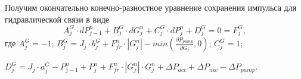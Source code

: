 Получим окончательно конечно-разностное уравнение сохранения импульса для гидравлической связи в виде
\begin{equation}
\label{formula413}
\boxed{A_j^G \cdot dP_{j-1}^n + B_j^G \cdot dG_j^n + C_j^G \cdot dP_j^n + D_j^G = 0 = F_j^G},
\end{equation}
где $A_j^G=-1$; $B_j^G = J_j \cdot b_j^G + F_{fr}^n\cdot | G_j^n | - min\left(\frac{\partial P_{pump}}{\partial G_j},0\right) $; $C_j^G=1$;

\noindent $D_j^G = J_j \cdot a_j^G - P_{j-1}^n + P_j^n + F_{fr}^n\cdot | G_j^n | \cdot G_j^n + \Delta P_{acc} + \Delta P_{niv} - \Delta P_{pump} $. 
 






